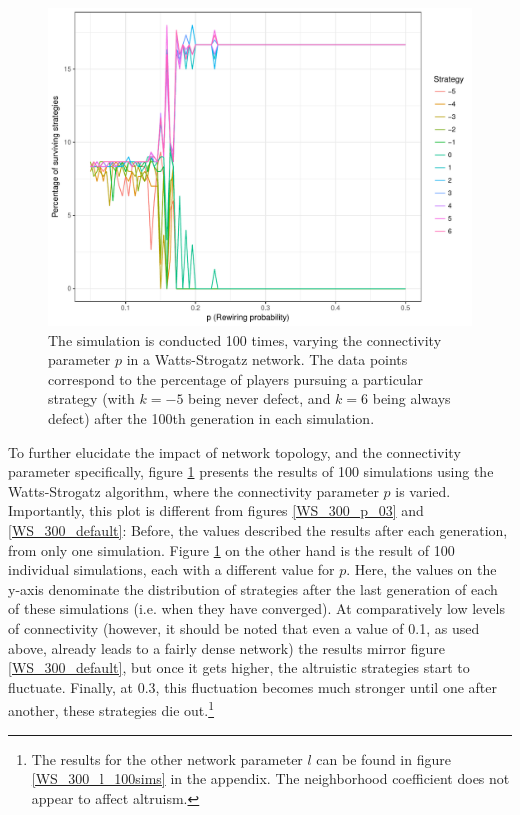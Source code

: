 \documentclass[12pt]{article}
\begin{document}
\begin{figure}
    \centering
    \includegraphics[width=\linewidth]{../figures/results_WS_300_p_100sims.pdf}
    \caption{The simulation is conducted 100 times, varying the connectivity parameter $p$ in a Watts-Strogatz network. The data points correspond to the percentage of players pursuing a particular strategy (with $k=-5$ being never defect, and $k=6$ being always defect) after the 100th generation in each simulation.}
    \label{WS_300_p_100sims}
\end{figure}

To further elucidate the impact of network topology, and the connectivity parameter specifically, figure \ref{WS_300_p_100sims} presents the results of 100 simulations using the Watts-Strogatz algorithm, where the connectivity parameter $p$ is varied. Importantly, this plot is different from  figures \ref{WS_300_p_03} and \ref{WS_300_default}: Before, the values described the results after each generation, from only one simulation. Figure \ref{WS_300_p_100sims} on the other hand is the result of 100 individual simulations, each with a different value for $p$. Here, the values on the y-axis denominate the distribution of strategies after the last generation of each of these simulations (i.e. when they have converged). At comparatively low levels of connectivity (however, it should be noted that even a value of 0.1, as used above, already leads to a fairly dense network) the results mirror figure \ref{WS_300_default}, but once it gets higher, the altruistic strategies start to fluctuate. Finally, at 0.3, this fluctuation becomes much stronger until one after another, these strategies die out.\footnote{The results for the other network parameter $l$ can be found in figure \ref{WS_300_l_100sims} in the appendix. The neighborhood coefficient does not appear to affect altruism.}
\end{document}
